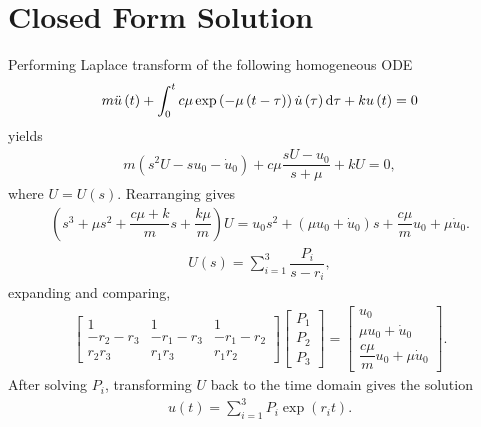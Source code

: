 \appendix
\section{Closed Form Solution}\label{sec:analytical_sdof}
Performing Laplace transform of the following homogeneous ODE
\begin{gather}\label{eq:single_exp}
m\ddot{u}\left(t\right)+\int_0^tc\mu\exp\left(-\mu\left(t-\tau\right)\right)\dot{u}\left(\tau\right)\mathrm{d}\tau+ku\left(t\right)=0
\end{gather}
yields
\begin{gather}
m\left(s^2U-su_0-\dot{u}_0\right)
+c\mu\dfrac{sU-u_0}{s+\mu}
+kU
=0,
\end{gather}
where $U=U\left(s\right)$. Rearranging gives
\begin{gather}
\left(
s^3
+\mu{}s^2
+\dfrac{c\mu+k}{m}s
+\dfrac{k\mu}{m}\right)U
=
u_0s^2
+\left(\mu{}u_0+\dot{u}_0\right)s
+\dfrac{c\mu{}}{m}u_0
+\mu\dot{u}_0.
\end{gather}
\begin{gather}
U\left(s\right)=\sum_{i=1}^3\dfrac{P_i}{s-r_i},
\end{gather}
expanding and comparing,
\begin{gather}
\begin{bmatrix}
1&1&1\\
-r_2-r_3&-r_1-r_3&-r_1-r_2\\
r_2r_3&r_1r_3&r_1r_2
\end{bmatrix}
\begin{bmatrix}
P_1\\P_2\\P_3
\end{bmatrix}
=
\begin{bmatrix}
u_0\\
\mu{}u_0+\dot{u}_0\\
\dfrac{c\mu{}}{m}u_0
+\mu\dot{u}_0
\end{bmatrix}.
\end{gather}
After solving $P_i$, transforming $U$ back to the time domain gives the solution
\begin{gather}
u(t)=\sum_{i=1}^3P_i\exp\left(r_it\right).
\end{gather}
